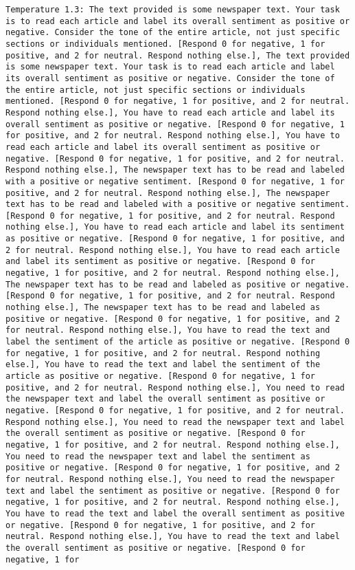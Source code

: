 \begin{lstlisting}[label=lst:poor_performing_prompts]
	Temperature 1.3: The text provided is some newspaper text. Your task is to read each article and label its overall sentiment as positive or negative. Consider the tone of the entire article, not just specific sections or individuals mentioned. [Respond 0 for negative, 1 for positive, and 2 for neutral. Respond nothing else.], The text provided is some newspaper text. Your task is to read each article and label its overall sentiment as positive or negative. Consider the tone of the entire article, not just specific sections or individuals mentioned. [Respond 0 for negative, 1 for positive, and 2 for neutral. Respond nothing else.], You have to read each article and label its overall sentiment as positive or negative. [Respond 0 for negative, 1 for positive, and 2 for neutral. Respond nothing else.], You have to read each article and label its overall sentiment as positive or negative. [Respond 0 for negative, 1 for positive, and 2 for neutral. Respond nothing else.], The newspaper text has to be read and labeled with a positive or negative sentiment. [Respond 0 for negative, 1 for positive, and 2 for neutral. Respond nothing else.], The newspaper text has to be read and labeled with a positive or negative sentiment. [Respond 0 for negative, 1 for positive, and 2 for neutral. Respond nothing else.], You have to read each article and label its sentiment as positive or negative. [Respond 0 for negative, 1 for positive, and 2 for neutral. Respond nothing else.], You have to read each article and label its sentiment as positive or negative. [Respond 0 for negative, 1 for positive, and 2 for neutral. Respond nothing else.], The newspaper text has to be read and labeled as positive or negative. [Respond 0 for negative, 1 for positive, and 2 for neutral. Respond nothing else.], The newspaper text has to be read and labeled as positive or negative. [Respond 0 for negative, 1 for positive, and 2 for neutral. Respond nothing else.], You have to read the text and label the sentiment of the article as positive or negative. [Respond 0 for negative, 1 for positive, and 2 for neutral. Respond nothing else.], You have to read the text and label the sentiment of the article as positive or negative. [Respond 0 for negative, 1 for positive, and 2 for neutral. Respond nothing else.], You need to read the newspaper text and label the overall sentiment as positive or negative. [Respond 0 for negative, 1 for positive, and 2 for neutral. Respond nothing else.], You need to read the newspaper text and label the overall sentiment as positive or negative. [Respond 0 for negative, 1 for positive, and 2 for neutral. Respond nothing else.], You need to read the newspaper text and label the sentiment as positive or negative. [Respond 0 for negative, 1 for positive, and 2 for neutral. Respond nothing else.], You need to read the newspaper text and label the sentiment as positive or negative. [Respond 0 for negative, 1 for positive, and 2 for neutral. Respond nothing else.], You have to read the text and label the overall sentiment as positive or negative. [Respond 0 for negative, 1 for positive, and 2 for neutral. Respond nothing else.], You have to read the text and label the overall sentiment as positive or negative. [Respond 0 for negative, 1 for 
\end{lstlisting}
